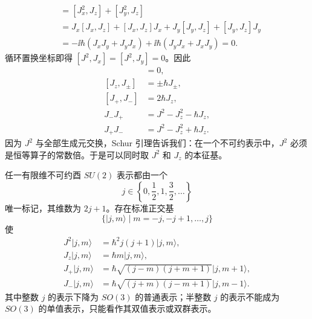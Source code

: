 \begin{align*}
[J^2,J_z]
&=[J_x^2,J_z]+[J_y^2,J_z]\\
&=J_x[J_x,J_z]+[J_x,J_z]J_x
 +J_y[J_y,J_z]+[J_y,J_z]J_y\\
&=-\ii\hbar(J_xJ_y+J_yJ_x)
 +\ii\hbar(J_yJ_x+J_xJ_y)=0.
\end{align*}
循环置换坐标即得 $[J^2,J_x]=[J^2,J_y]=0$。因此
\begin{align}
[J^2,J_i]&=0,\label{eq:J2-commutes}\\
[J_z,J_\pm]&=\pm\hbar J_\pm,\label{eq:Jz-ladder}\\
[J_+,J_-]&=2\hbar J_z,\label{eq:Jpm-commutator}\\
J_-J_+&=J^2-J_z^2-\hbar J_z,\label{eq:JminusJplus}\\
J_+J_-&=J^2-J_z^2+\hbar J_z.\label{eq:JplusJminus}
\end{align}
因为 $J^2$ 与全部生成元交换，Schur 引理告诉我们：在一个不可约表示中，$J^2$ 必须是恒等算子的常数倍。于是可以同时取 $J^2$ 和 $J_z$ 的本征基。

\begin{theorem}[角动量不可约表示的分类]
任一有限维不可约酉 $SU(2)$ 表示都由一个
\[
j\in\left\{0,\frac12,1,\frac32,\dots\right\}
\]
唯一标记，其维数为 $2j+1$。存在标准正交基
\[
\{\lvert j,m\rangle\mid m=-j,-j+1,\dots,j\}
\]
使
\begin{align}
J^2\lvert j,m\rangle&=\hbar^2j(j+1)\lvert j,m\rangle,\label{eq:J2-eigen}\\
J_z\lvert j,m\rangle&=\hbar m\lvert j,m\rangle,\label{eq:Jz-eigen}\\
J_+\lvert j,m\rangle
&=\hbar\sqrt{(j-m)(j+m+1)}\lvert j,m+1\rangle,\label{eq:Jplus-action}\\
J_-\lvert j,m\rangle
&=\hbar\sqrt{(j+m)(j-m+1)}\lvert j,m-1\rangle.\label{eq:Jminus-action}
\end{align}
其中整数 $j$ 的表示下降为 $SO(3)$ 的普通表示；半整数 $j$ 的表示不能成为 $SO(3)$ 的单值表示，只能看作其双值表示或双群表示。

\end{theorem}

